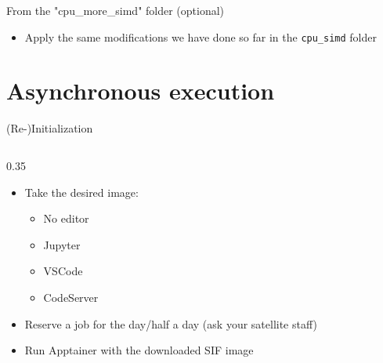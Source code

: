 \documentclass[
    aspectratio=169,
]{beamer}
\begin{document}
\begin{exerciseframe}{From the "cpu\_more\_simd" folder (optional)}
    \begin{itemize}
        \item Apply the same modifications we have done so far in the \texttt{cpu\_simd} folder
    \end{itemize}
\end{exerciseframe}

\section{Asynchronous execution}

\begin{exerciseframe}{(Re-)Initialization}
    \begin{columns}
        \begin{column}{0.35\linewidth}
            \begin{itemize}
                \item Take the desired image:
                \begin{itemize}
                    \item No editor
                    \item Jupyter
                    \item VSCode
                    \item CodeServer
                \end{itemize}
                \item Reserve a job for the day/half a day (ask your satellite staff)
                \item Run Apptainer with the downloaded SIF image
            \end{itemize}
        \end{column}
    \end{columns}
\end{exerciseframe}
\end{document}
